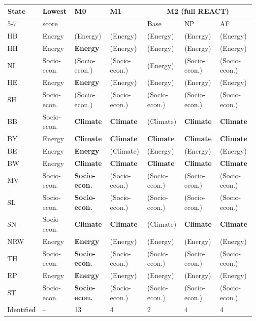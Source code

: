 \begin{tabular}{@{}lllllll@{}}
\toprule
State & Lowest & M0 & M1 & \multicolumn{3}{c}{M2 (full REACT)} \\
\cmidrule(l){5-7}
 & score & & & Base & NP & AF \\
\midrule
HB & Energy & (Energy) & (Energy) & (Energy) & (Energy) & (Energy) \\
HH & Energy & \textbf{Energy} & (Energy) & (Energy) & (Energy) & (Energy) \\
NI & Socio-econ. & (Socio-econ.) & (Socio-econ.) & (Energy) & (Socio-econ.) & (Socio-econ.) \\
HE & Energy & \textbf{Energy} & (Energy) & (Energy) & (Energy) & (Energy) \\
SH & Socio-econ. & (Socio-econ.) & (Socio-econ.) & (Socio-econ.) & (Socio-econ.) & (Socio-econ.) \\
BB & Socio-econ. & \textbf{Climate} & \textbf{Climate} & (Climate) & \textbf{Climate} & \textbf{Climate} \\
BY & Energy & \textbf{Climate} & \textbf{Climate} & \textbf{Climate} & \textbf{Climate} & \textbf{Climate} \\
BE & Energy & \textbf{Energy} & (Climate) & (Energy) & (Energy) & (Energy) \\
BW & Energy & \textbf{Climate} & \textbf{Climate} & \textbf{Climate} & \textbf{Climate} & \textbf{Climate} \\
MV & Socio-econ. & \textbf{Socio-econ.} & (Socio-econ.) & (Socio-econ.) & (Socio-econ.) & (Socio-econ.) \\
SL & Socio-econ. & \textbf{Socio-econ.} & (Socio-econ.) & (Socio-econ.) & (Socio-econ.) & (Socio-econ.) \\
SN & Socio-econ. & \textbf{Climate} & \textbf{Climate} & (Climate) & \textbf{Climate} & \textbf{Climate} \\
NRW & Energy & \textbf{Energy} & (Energy) & (Energy) & (Energy) & (Energy) \\
TH & Socio-econ. & \textbf{Socio-econ.} & (Socio-econ.) & (Socio-econ.) & (Socio-econ.) & (Socio-econ.) \\
RP & Energy & \textbf{Energy} & (Energy) & (Energy) & (Energy) & (Energy) \\
ST & Socio-econ. & \textbf{Socio-econ.} & (Socio-econ.) & (Socio-econ.) & (Socio-econ.) & (Socio-econ.) \\
\midrule
Identified & -- & 13 & 4 & 2 & 4 & 4 \\
\bottomrule
\end{tabular}
